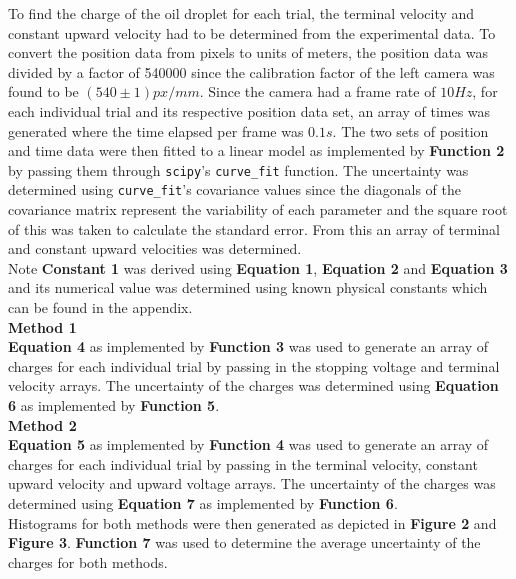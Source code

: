 \documentclass[
	letterpaper, %
	10pt, %
]{CSUniSchoolLabReport}
\begin{document}
To find the charge of the oil droplet for each trial, the terminal velocity and constant
upward velocity had to be determined from the experimental data. To convert the
position data from pixels to units of meters, the position data was divided by
a factor of 540000 since the calibration factor of the left camera was found to
be $(540 \pm 1) px/mm$. Since the camera had a frame rate of $10 Hz$, for each individual
trial and its respective position data set, an array of times was generated where the
time elapsed per frame was $0.1 s$. The two sets of position and time data were then
fitted to a linear model as implemented by \textbf{Function 2} by passing them through \lstinline{scipy}'s
\lstinline{curve_fit} function. The uncertainty was determined using \lstinline{curve_fit}'s
covariance values since the diagonals of the covariance matrix represent the variability
of each parameter and the square root of this was taken to calculate the standard error.
From this an array of terminal and constant upward velocities was determined.\\

Note \textbf{Constant 1} was derived using \textbf{Equation 1}, \textbf{Equation 2} and \textbf{Equation 3} and its
numerical value was determined using known physical constants which can be found in the appendix.\\

{\large\textbf{Method 1}}\\
\textbf{Equation 4} as implemented by \textbf{Function 3} was used to generate an array of charges for
each individual trial by passing in the stopping voltage and terminal velocity arrays. The uncertainty
of the charges was determined using \textbf{Equation 6} as implemented by \textbf{Function 5}.\\

{\large\textbf{Method 2}}\\
\textbf{Equation 5} as implemented by \textbf{Function 4} was used to generate an array of charges for
each individual trial by passing in the terminal velocity, constant upward velocity and upward voltage
arrays. The uncertainty of the charges was determined using \textbf{Equation 7} as implemented by
\textbf{Function 6}.\\

Histograms for both methods were then generated as depicted in \textbf{Figure 2} and \textbf{Figure 3}.
\textbf{Function 7} was used to determine the average uncertainty of the charges for both methods.\\
\end{document}
